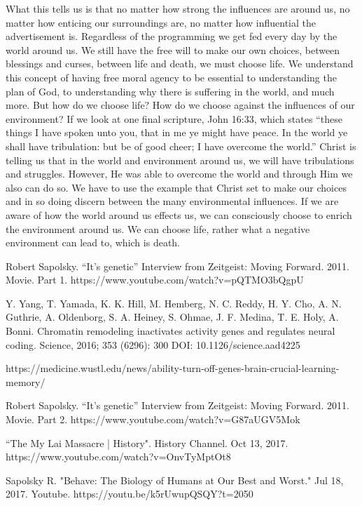 \documentclass[11pt]{article}
\begin{document}
\begin{multicols}{2}
What this tells us is that no matter how strong the influences are around us, no matter how enticing our surroundings are, no matter how influential the advertisement is. Regardless of the programming we get fed every day by the world around us. We still have the free will to make our own choices, between blessings and curses, between life and death, we must choose life. We understand this concept of having free moral agency to be essential to understanding the plan of God, to understanding why there is suffering in the world, and much more. But how do we choose life? How do we choose against the influences of our environment? If we look at one final scripture, John 16:33, which states ``these things I have spoken unto you, that in me ye might have peace. In the world ye shall have tribulation: but be of good cheer; I have overcome the world.'' Christ is telling us that in the world and environment around us, we will have tribulations and struggles. However, He was able to overcome the world and through Him we also can do so. We have to use the example that Christ set to make our choices and in so doing discern between the many environmental influences. If we are aware of how the world around us effects us, we can consciously choose to enrich the environment around us. We can choose life, rather what a negative environment can lead to, which is death.



\begin{thebibliography}{9}
	{\footnotesize
	 Robert Sapolsky. ``It's genetic'' Interview from Zeitgeist: Moving Forward. 2011. Movie. Part 1. https://www.youtube.com/watch?v=pQTMO3bQgpU	
	
	 Y. Yang, T. Yamada, K. K. Hill, M. Hemberg, N. C. Reddy, H. Y. Cho, A. N. Guthrie, A. Oldenborg, S. A. Heiney, S. Ohmae, J. F. Medina, T. E. Holy, A. Bonni. Chromatin remodeling inactivates activity genes and regulates neural coding. Science, 2016; 353 (6296): 300 DOI: 10.1126/science.aad4225
	
	 https://medicine.wustl.edu/news/ability-turn-off-genes-brain-crucial-learning-memory/
		
	 Robert Sapolsky. ``It's genetic'' Interview from Zeitgeist: Moving Forward. 2011. Movie. Part 2. https://www.youtube.com/watch?v=G87aUGV5Mok
		
	 ``The My Lai Massacre | History". History Channel. Oct 13, 2017. https://www.youtube.com/watch?v=OnvTyMptOt8
	
	 Sapolsky R. "Behave: The Biology of Humans at Our Best and Worst." Jul 18, 2017. Youtube.  https://youtu.be/k5rUwupQSQY?t=2050
	}
\end{thebibliography}

\end{multicols}


\end{document}
